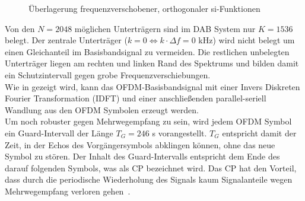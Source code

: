 \begin{figure}
\begin{center}
\end{center}
\caption{Überlagerung frequenzverschobener, orthogonaler si-Funktionen}
\label{fig:OFDM}
\end{figure}

Von den $N=2048$ möglichen Unterträgern sind im DAB System nur $K = 1536$ belegt. Der zentrale Unterträger ($k=0 \Leftrightarrow k\cdot \Delta f = 0$ kHz) wird nicht belegt um einen Gleichanteil im Basisbandsignal zu vermeiden. Die restlichen unbelegten Unterträger liegen am rechten und linken Rand des Spektrums und bilden damit ein Schutzintervall gegen grobe Frequenzverschiebungen.\\
Wie in \cite{ofdm:idft} gezeigt wird, kann das OFDM-Basisbandsignal mit einer Invers Diskreten Fourier Transformation (IDFT) und einer anschließenden parallel-seriell Wandlung aus den OFDM Symbolen erzeugt werden.\\
Um noch robuster gegen Mehrwegempfang zu sein, wird jedem OFDM Symbol ein Guard-Intervall der Länge $T_G=246$ \textmu s vorangestellt. $T_G$ entspricht damit der Zeit, in der Echos des Vorgängersymbols abklingen können, ohne das neue Symbol zu stören. Der Inhalt des Guard-Intervalls entspricht dem Ende des darauf folgenden Symbols, was als \ac{CP} bezeichnet wird. Das \ac{CP} hat den Vorteil, dass durch die periodische Wiederholung des Signals kaum Signalanteile wegen Mehrwegempfang verloren gehen~\cite{nt1}.

